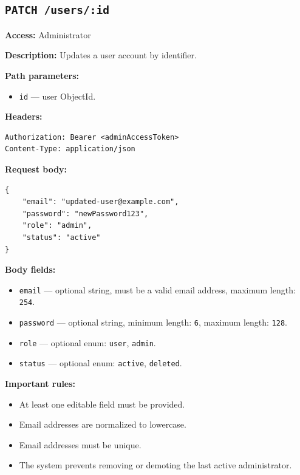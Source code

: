 \pagebreak
\subsection{\texttt{PATCH /users/:id}}

\textbf{Access:} Administrator

\textbf{Description:} Updates a user account by identifier.

\textbf{Path parameters:}

\begin{itemize}
    \item \texttt{id} --- user ObjectId.
\end{itemize}

\textbf{Headers:}

\begin{verbatim}
Authorization: Bearer <adminAccessToken>
Content-Type: application/json
\end{verbatim}

\textbf{Request body:}

\begin{verbatim}
{
    "email": "updated-user@example.com",
    "password": "newPassword123",
    "role": "admin",
    "status": "active"
}
\end{verbatim}

\textbf{Body fields:}

\begin{itemize}
    \item \texttt{email} --- optional string, must be a valid email address, maximum length: \texttt{254}.
    \item \texttt{password} --- optional string, minimum length: \texttt{6}, maximum length: \texttt{128}.
    \item \texttt{role} --- optional enum: \texttt{user}, \texttt{admin}.
    \item \texttt{status} --- optional enum: \texttt{active}, \texttt{deleted}.
\end{itemize}

\textbf{Important rules:}

\begin{itemize}
    \item At least one editable field must be provided.
    \item Email addresses are normalized to lowercase.
    \item Email addresses must be unique.
    \item The system prevents removing or demoting the last active administrator.
\end{itemize}

